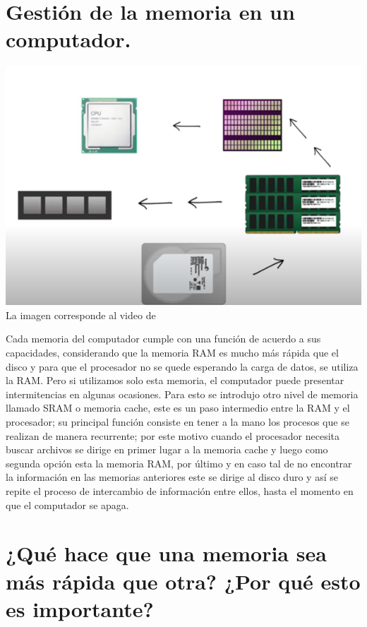 \documentclass[12pt,oneside]{book}
\begin{document}
\section{Gestión de la memoria en un computador.} 

\includegraphics[width=1.00\textwidth]{imagen 2.PNG}
La imagen corresponde al video de  \cite{memoria}
\vspace{0.2cm}

Cada memoria del computador cumple con una función de acuerdo a sus capacidades, considerando que la memoria RAM es mucho más rápida que el disco  y  para que el procesador no se quede esperando la carga de datos, se utiliza la RAM. Pero si utilizamos solo esta memoria, el computador puede presentar intermitencias  en algunas ocasiones. Para esto se introdujo otro nivel de memoria llamado SRAM o memoria cache, este es un paso intermedio entre la RAM y el procesador; su principal función consiste en tener a la mano los procesos que se realizan de manera recurrente; por este motivo cuando  el procesador necesita buscar archivos se dirige en primer lugar a la memoria cache  y luego como segunda opción esta la memoria RAM, por último y en caso tal de no encontrar la información en las memorias anteriores este se dirige al disco duro y así se repite el proceso de intercambio de información entre ellos, hasta el momento en que el computador se apaga.


\section{¿Qué hace que una memoria sea más rápida que otra? ¿Por qué esto es importante?}
\end{document}
